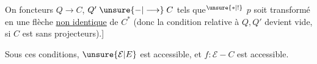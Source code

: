 On  foncteurs $Q\longrightarrow C$, $Q'\mathrel{\unsure{-|\longrightarrow}}C$
tels que$^{\unsure{*|!}}$ $p$ soit transformé en une
flèche \uline{non identique} de $C^{*}$ (donc la
condition relative à $Q,Q'$ devient vide, si
$C$ est sans projecteurs).]

Sous ces conditions, $\unsure{\mathcal E|E}$ est accessible, et
$f:\mathcal E\mathrel{-}C$ est accessible.
